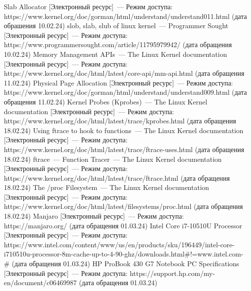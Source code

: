 \begin{thebibliography}{}
	 Slab Allocator [Электронный ресурс]~--- Режим доступа: https://www.kernel.org/doc/gorman/html/understand/understand011.html (дата обрашения 10.02.24)
	 slob, slab, slub of linux kernel~--- Programmer Sought [Электронный ресурс]~--- Режим доступа: https://www.programmersought.com/article/11795979942/ (дата обращения 10.02.24)
	 Memory Management APIs~--- The Linux Kernel documentation [Электронный ресурс]~--- Режим доступа: https://www.kernel.org/doc/html/latest/core-api/mm-api.html (дата обращения 11.02.24)
	 Physical Page Allocation [Электронный ресурс]~--- Режим доступа: https://www.kernel.org/doc/gorman/html/understand/understand009.html (дата обращения 11.02.24)
	 Kernel Probes (Kprobes)~--- The Linux Kernel documentation [Электронный ресурс]~--- Режим доступа: https://www.kernel.org/doc/html/latest/trace/kprobes.html (дата обращения 18.02.24)
	 Using ftrace to hook to functions~--- The Linux Kernel documentation [Электронный ресурс]~--- Режим доступа: https://www.kernel.org/doc/html/latest/trace/ftrace-uses.html (дата обращения 18.02.24)
	 ftrace~--- Function Tracer~--- The Linux Kernel documentation [Электронный ресурс]~--- Режим доступа: https://www.kernel.org/doc/html/latest/trace/ftrace.html (дата обращения 18.02.24)
	 The /proc Filesystem~--- The Linux Kernel documentation [Электронный ресурс]~--- Режим доступа: https://www.kernel.org/doc/html/latest/filesystems/proc.html (дата обращения 18.02.24)
	 Manjaro [Электронный ресурс]~--- Режим доступа: https://manjaro.org/ (дата обращения 01.03.24)
	 Intel Core i7-10510U Processor [Электронный ресурс]~--- Режим доступа: https://www.intel.com/content/www/us/en/products/sku/196449/intel-core-i710510u-processor-8m-cache-up-to-4-90-ghz/downloads.html\#!=www.intel.com-\#  (дата обращения 01.03.24)
	 HP ProBook 430 G7 Notebook PC Specifications [Электронный ресурс]~--- Режим доступа: https://support.hp.com/my-en/document/c06469987 (дата обращения 01.03.24)
\end{thebibliography}
